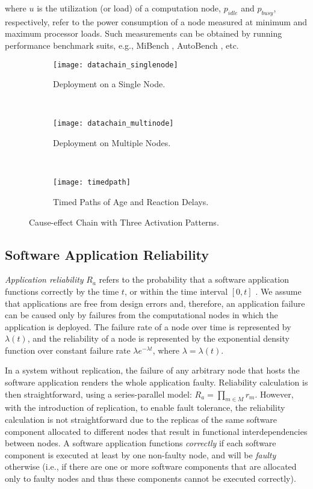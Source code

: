 where $u$ is the utilization (or load) of a computation node, $p_{idle}$ and $p_{busy}$, respectively, refer to the power consumption of a node measured at minimum and maximum processor loads. Such measurements can be obtained by running performance benchmark suits, e.g., MiBench \cite{Guthaus2001MiBench:Suite}, AutoBench \cite{EMBC2018AutoBenchProcessors}, etc.
\begin{figure*}[h!]
    \centering
    \begin{subfigure}[b]{0.25\textwidth}
    \texttt{[image: datachain\_singlenode]}
    \caption{Deployment on a Single Node.}
    \label{fig_datachainsingle}
    \end{subfigure}
    ~ %
    \begin{subfigure}[b]{0.365\textwidth}
    \texttt{[image: datachain\_multinode]}
    \caption{Deployment on Multiple Nodes.}
    \label{fig_datachainmulti}
    \end{subfigure}
   ~\vspace{-0.2cm}
    \begin{subfigure}[b]{0.35\textwidth}
    \texttt{[image: timedpath]}
    \caption{Timed Paths of Age and Reaction Delays.}
    \label{fig_timedpath}
    \end{subfigure}
    \caption{Cause-effect Chain with Three Activation Patterns.}
    \label{fig:datachain}
\end{figure*}

\subsection{Software Application Reliability}
\textit{Application reliability} $R_a$ refers to the probability that a software application functions correctly by the time $t$, or within the time interval $[0, t]$ \cite{Goel1985SoftwareApplicability}. We assume that  applications are free from design errors and, therefore, an application failure can be caused only by failures from the computational nodes in which the application is deployed. The failure rate of a node over time is represented by $\lambda(t)$, and the reliability of a node is represented by the exponential density function over constant failure rate $\lambda e^{-\lambda t}$, where $\lambda=\lambda(t)$.

In a system without replication, the failure of any arbitrary node that hosts the software application renders the whole application faulty. Reliability calculation is then straightforward, using a series-parallel model: $R_a = \prod_{m\in M}r_m$.  However, with the introduction of replication, to enable fault tolerance, the reliability calculation is not straightforward due to the replicas of the same software component allocated to different nodes that result in functional interdependencies between nodes. A software application functions \textit{ correctly} if each software component is executed at least by one non-faulty node, and will be \textit{faulty} otherwise (i.e., if there are one or more software components that are allocated only to faulty nodes and thus these components cannot be executed correctly).

